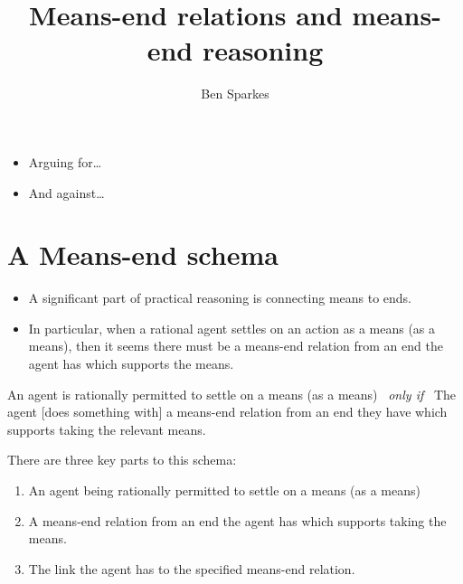 \documentclass[10pt]{article}
\title{Means-end relations and means-end reasoning}
\author{Ben Sparkes}
\newenvironment{beamerblock}[1]{%
  \tcolorbox[standard,%
  no shadow,
  noparskip,
  colback=white,
  colframe=black,
  colbacktitle=white,
  coltitle=black,
  colupper=black,
  size=small,
  boxrule=.125mm,
  fonttitle=\bfseries,
  sharp corners=all,
  title=#1]}%
{\endtcolorbox}
\newcommand{\hozlinedash}[0]{%
  \noindent\hdashrule[0.5ex][c]{\textwidth}{.1pt}{2.5pt}
}
\begin{document}

\maketitle

\tableofcontents

\hozlinedash

\begin{itemize}
\item Arguing for\dots
\item And against\dots
\end{itemize}

\hozlinedash


\newpage

\section{A Means-end schema}
\label{sec:means-end-schema}


\begin{itemize}
\item A significant part of practical reasoning is connecting means to ends.
\item In particular, when a rational agent settles on an action as a means (as a means), then it seems there must be a means-end relation from an end the agent has which supports the means.
\end{itemize}

\begin{beamerblock}{Means-end schema}
  An agent is rationally permitted to settle on a means (as a means)
  \newline
  \mbox{ }\hfill\emph{only if}\hfill\mbox{ }
  \newline
  The agent [{does something with}] a means-end relation from an end they have which supports taking the relevant means.
\end{beamerblock}

There are three key parts to this schema:
\begin{enumerate}[label=\arabic*., ref=(\arabic*)]
\item An agent being rationally permitted to settle on a means (as a means)
\item A means-end relation from an end the agent has which supports taking the means.
\item The link the agent has to the specified means-end relation.
\end{enumerate}
\end{document}
